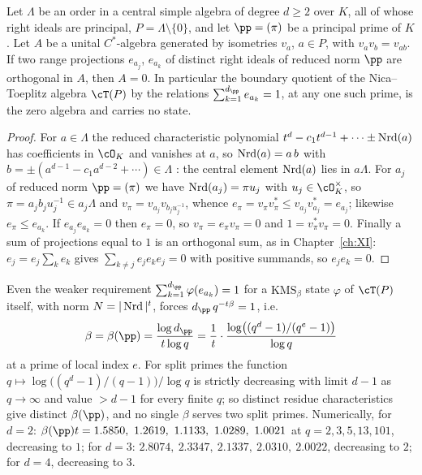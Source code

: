 \begin{theorem}\label{XII:thm:noboundary}
Let $\Lambda$ be an order in a central simple algebra of degree $d\ge2$ over $K$, all of
whose right ideals are principal, $P=\Lambda\setminus\{0\}$, and let $\pp=(\pi)$ be a
principal prime of $K$. Let $A$ be a unital $C^*$-algebra generated by isometries $v_a$,
$a\in P$, with $v_av_b=v_{ab}$. If two range projections $e_{a_j}$, $e_{a_k}$ of distinct
right ideals of reduced norm $\pp$ are orthogonal in $A$, then $A=0$. In particular the
boundary quotient of the Nica--Toeplitz algebra $\cT(P)$ by the relations
$\sum_{k=1}^{d_\pp}e_{a_k}=1$, at any one such prime, is the zero algebra and carries no
state.
\end{theorem}

\begin{proof}
For $a\in\Lambda$ the reduced characteristic polynomial $t^d-c_1t^{d-1}+\cdots\pm\operatorname{Nrd}(a)$ has
coefficients in $\cO_K$ and vanishes at $a$, so $\operatorname{Nrd}(a)=a\,b$ with
$b=\pm(a^{d-1}-c_1a^{d-2}+\cdots)\in\Lambda$ \cite[\S9]{Reiner}: the central element $\operatorname{Nrd}(a)$
lies in $a\Lambda$. For $a_j$ of reduced norm $\pp=(\pi)$ we have $\operatorname{Nrd}(a_j)=\pi u_j$ with
$u_j\in\cO_K^\times$, so $\pi=a_jb_ju_j^{-1}\in a_j\Lambda$ and $v_\pi=v_{a_j}v_{b_ju_j^{-1}}$,
whence $e_\pi=v_\pi v_\pi^*\le v_{a_j}v_{a_j}^*=e_{a_j}$; likewise $e_\pi\le e_{a_k}$. If
$e_{a_j}e_{a_k}=0$ then $e_\pi=0$, so $v_\pi=e_\pi v_\pi=0$ and $1=v_\pi^*v_\pi=0$. Finally a
sum of projections equal to $1$ is an orthogonal sum, as in Chapter~\ref{ch:XI}: $e_j=e_j\sum_ke_k$ gives
$\sum_{k\ne j}e_je_ke_j=0$ with positive summands, so $e_je_k=0$.
\end{proof}

\begin{remark}\label{XII:rem:betavals}
Even the weaker requirement $\sum_{k=1}^{d_\pp}\varphi(e_{a_k})=1$ for a $\mathrm{KMS}_\beta$
state $\varphi$ of $\cT(P)$ itself, with norm $N=|\operatorname{Nrd}|^t$, forces $d_\pp\,q^{-t\beta}=1$, i.e.
\[
\beta=\beta(\pp)=\frac{\log d_\pp}{t\log q}=\frac{1}{t}\cdot\frac{\log\bigl((q^d-1)/(q^e-1)\bigr)}{\log q}
\]
at a prime of local index $e$. For split primes the function
$q\mapsto\log\bigl((q^d-1)/(q-1)\bigr)/\log q$ is strictly decreasing with limit $d-1$ as
$q\to\infty$ and value $>d-1$ for every finite $q$; so distinct residue characteristics give
distinct $\beta(\pp)$, and no single $\beta$ serves two split primes. Numerically, for
$d=2$: $\beta(\pp)t=1.5850,\ 1.2619,\ 1.1133,\ 1.0289,\ 1.0021$ at $q=2,3,5,13,101$, decreasing
to $1$; for $d=3$: $2.8074,\ 2.3347,\ 2.1337,\ 2.0310,\ 2.0022$, decreasing to $2$; for $d=4$,
decreasing to $3$.
\end{remark}

